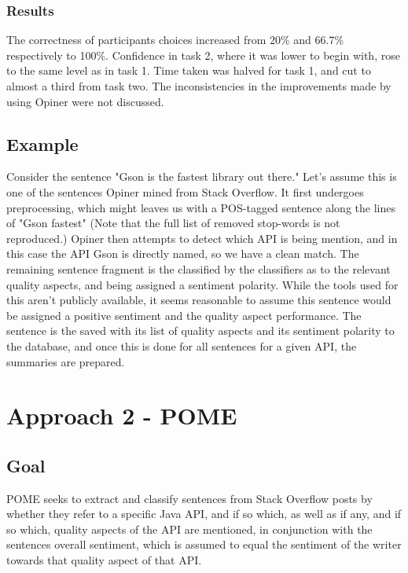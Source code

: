 \documentclass[a4paper,10pt, bibliography=totocnumbered]{scrreprt}
\begin{document}
\subsection{Results}

The correctness of participants choices increased from 20\% and 66.7\% respectively to 100\%. Confidence in task 2, where it was lower to begin with, rose to the same level as in task 1. Time taken was halved for task 1, and cut to almost a third from task two. The inconsistencies in the improvements made by using Opiner were not discussed.

\section{Example}

Consider the sentence "Gson is the fastest library out there." Let's assume this is one of the sentences Opiner mined from Stack Overflow. It first undergoes preprocessing, which might leaves us with a POS-tagged sentence along the lines of "Gson fastest" (Note that the full list of removed stop-words is not reproduced.) Opiner then attempts to detect which API is being mention, and in this case the API Gson is directly named, so we have a clean match. The remaining sentence fragment is the classified by the classifiers as to the relevant quality aspects, and being assigned a sentiment polarity. While the tools used for this aren't publicly available, it seems reasonable to assume this sentence would be assigned a positive sentiment and the quality aspect performance. The sentence is the saved with its list of quality aspects and its sentiment polarity to the database, and once this is done for all sentences for a given API, the summaries are prepared. 

\chapter{Approach 2 - POME}

\section{Goal}

POME \cite{POME} seeks to extract and classify sentences from Stack Overflow posts by whether they refer to a specific Java API, and if so which, as well as if any, and if so which, quality aspects of the API are mentioned, in conjunction with the sentences overall sentiment, which is assumed to equal the sentiment of the writer towards that quality aspect of that API.
\end{document}
